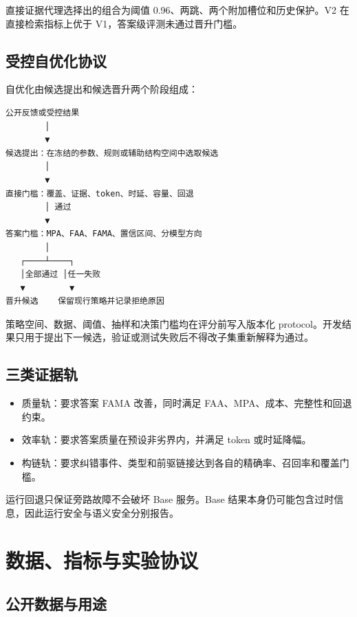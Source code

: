 直接证据代理选择出的组合为阈值 0.96、两跳、两个附加槽位和历史保护。V2 在直接检索指标上优于 V1，答案级评测未通过晋升门槛。

\subsection{受控自优化协议}

自优化由候选提出和候选晋升两个阶段组成：

\begin{Verbatim}[fontsize=\small]
公开反馈或受控结果
        │
        ▼
候选提出：在冻结的参数、规则或辅助结构空间中选取候选
        │
        ▼
直接门槛：覆盖、证据、token、时延、容量、回退
        │ 通过
        ▼
答案门槛：MPA、FAA、FAMA、置信区间、分模型方向
        │
   ┌────┴────┐
   │全部通过 │任一失败
   ▼         ▼
晋升候选    保留现行策略并记录拒绝原因
\end{Verbatim}

策略空间、数据、阈值、抽样和决策门槛均在评分前写入版本化 protocol。开发结果只用于提出下一候选，验证或测试失败后不得改子集重新解释为通过。

\subsection{三类证据轨}

\begin{itemize}
\item 质量轨：要求答案 FAMA 改善，同时满足 FAA、MPA、成本、完整性和回退约束。
\item 效率轨：要求答案质量在预设非劣界内，并满足 token 或时延降幅。
\item 构链轨：要求纠错事件、类型和前驱链接达到各自的精确率、召回率和覆盖门槛。
\end{itemize}

运行回退只保证旁路故障不会破坏 Base 服务。Base 结果本身仍可能包含过时信息，因此运行安全与语义安全分别报告。

\section{数据、指标与实验协议}

\subsection{公开数据与用途}

